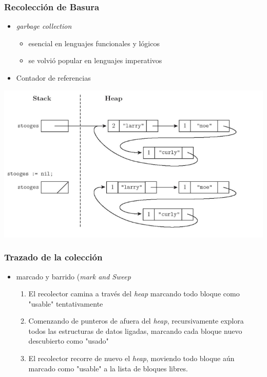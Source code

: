 \documentclass[11pt]{article}
\begin{document}
\subsubsection*{Recolección de Basura}
\label{sec:org1797c3c}
\begin{itemize}
\item \emph{garbage collection}
\begin{itemize}
\item esencial en lenguajes funcionales y lógicos
\item se volvió popular en lenguajes imperativos
\end{itemize}
\item Contador de referencias
\end{itemize}
\begin{center}
\begin{center}
\includegraphics[width=.9\linewidth]{contadref.png}
\end{center}
\end{center}
\subsubsection*{Trazado de la colección}
\label{sec:org0a372b2}
\begin{itemize}
\item marcado y barrido (\emph{mark and Sweep}
\begin{enumerate}
\item El recolector camina a través del \emph{heap} marcando todo bloque como
"usable" tentativamente
\item Comenzando de punteros de afuera del \emph{heap}, recursivamente
explora todos las estructuras de datos ligadas, marcando cada
bloque nuevo descubierto como "usado"
\item El recolector recorre de nuevo el \emph{heap}, moviendo todo bloque
aún marcado como "usable" a la lista de bloques libres.
\end{enumerate}
\end{itemize}
\end{document}
